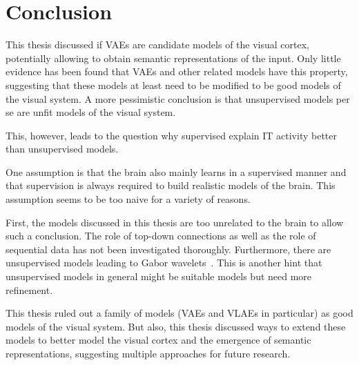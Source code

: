 \documentclass[11pt]{article}
\let\oldsection\section
\renewcommand\section{\clearpage\oldsection}
\newcounter{savepage}
\begin{document}
\section{Conclusion}\label{sec:conclusion}

This thesis discussed if \acfp{VAE} are candidate models of the visual cortex, potentially allowing to obtain semantic representations of the input.
Only little evidence has been found that \acp{VAE} and other related models have this property, suggesting that these models at least need to be modified to be good models of the visual system.
A more pessimistic conclusion is that unsupervised models per se are unfit models of the visual system.

This, however, leads to the question why supervised explain \ac{IT} activity better than unsupervised models.

One assumption is that the brain also mainly learns in a supervised manner and that supervision is always required to build realistic models of the brain.
This assumption seems to be too naive for a variety of reasons.

First, the models discussed in this thesis are too unrelated to the brain to allow such a conclusion.
The role of top-down connections as well as the role of sequential data has not been investigated thoroughly.
Furthermore, there are unsupervised models leading to Gabor wavelets~\citep{berkes2005slow}.
This is another hint that unsupervised models in general might be suitable models but need more refinement.

This thesis ruled out a family of models (\acp{VAE} and \acp{VLAE} in particular) as good models of the visual system.
But also, this thesis discussed ways to extend these models to better model the visual cortex and the emergence of semantic representations, suggesting multiple approaches for future research.

\newpage
\printbibliography

\newpage
{}
\setcounter{page}{\thesavepage}
\appendix
\end{document}
